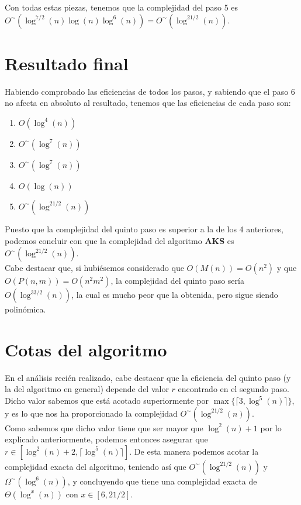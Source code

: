 Con todas estas piezas, tenemos que la complejidad del paso 5 es $O^\sim(\log^{7/2}(n)\log(n)\log^6(n)) = O^\sim(\log^{21/2}(n))$.

\section{Resultado final}

Habiendo comprobado las eficiencias de todos los pasos, y sabiendo que el paso 6 no afecta en absoluto al resultado, tenemos que las eficiencias de cada paso son:

\begin{enumerate}
	\item $O(\log^4(n))$
	\item $O^\sim(\log^7(n))$
	\item $O^\sim(\log^7(n))$
	\item $O(\log(n))$
	\item $O^\sim(\log^{21/2}(n))$
\end{enumerate}

Puesto que la complejidad del quinto paso es superior a la de los 4 anteriores, podemos concluir con que la complejidad del algoritmo \textbf{AKS} es $O^\sim(\log^{21/2}(n))$.\\

Cabe destacar que, si hubiésemos considerado que $O(M(n)) = O(n^2)$ y que $O(P(n, m)) = O(n^2m^2)$, la complejidad del quinto paso sería $O(\log^{33/2}(n))$, la cual es mucho peor que la obtenida, pero sigue siendo polinómica.

\section{Cotas del algoritmo}

En el análisis recién realizado, cabe destacar que la eficiencia del quinto paso (y la del algoritmo en general) depende del valor $r$ encontrado en el segundo paso. Dicho valor sabemos que está acotado superiormente por $\max\{\lceil 3, \log^5(n) \rceil\}$, y es lo que nos ha proporcionado la complejidad $O^\sim(\log^{21/2}(n))$.\\

Como sabemos que dicho valor tiene que ser mayor que $\log^2(n) + 1$ por lo explicado anteriormente, podemos entonces asegurar que $r \in [\log^2(n) + 2, \lceil\log^5(n)\rceil]$. De esta manera podemos acotar la complejidad exacta del algoritmo, teniendo así que $O^\sim(\log^{21/2}(n))$ y $\Omega^\sim(\log^6(n))$, y concluyendo que tiene una complejidad exacta de  $\Theta(\log^x(n))$ con $x \in [6, 21/2]$.

\endinput
